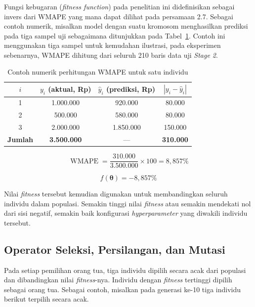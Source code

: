 Fungsi kebugaran (\textit{fitness function}) pada penelitian ini didefinisikan sebagai invers dari WMAPE yang mana dapat dilihat pada persamaan 2.7. Sebagai contoh numerik, misalkan model dengan suatu kromosom menghasilkan prediksi pada tiga sampel uji sebagaimana ditunjukkan pada Tabel~\ref{tab:contoh_wmape}.  Contoh ini menggunakan tiga sampel untuk kemudahan ilustrasi, pada eksperimen sebenarnya, WMAPE dihitung dari seluruh 210 baris data uji \textit{Stage 2}.

\begin{table}[h!]
\centering
\caption{Contoh numerik perhitungan WMAPE untuk satu individu}
\label{tab:contoh_wmape}
\begin{tabular}{cccc}
\toprule
$i$ & $y_i$ (aktual, Rp) & $\hat{y}_i$ (prediksi, Rp) & $|y_i - \hat{y}_i|$ \\
\midrule
1 & 1.000.000 & 920.000   & 80.000  \\
2 &   500.000 & 580.000   & 80.000  \\
3 & 2.000.000 & 1.850.000 & 150.000 \\
\midrule
\textbf{Jumlah} & \textbf{3.500.000} & --- & \textbf{310.000} \\
\bottomrule
\end{tabular}
\end{table}

\begin{equation}
\operatorname{WMAPE} = \frac{310.000}{3.500.000} \times 100 = 8{,}857\%
\end{equation}

\begin{equation}
f(\boldsymbol{\theta}) = -8{,}857\%
\end{equation}

Nilai \textit{fitness} tersebut kemudian digunakan untuk membandingkan seluruh individu dalam populasi. Semakin tinggi nilai \textit{fitness} atau semakin mendekati nol dari sisi negatif, semakin baik konfigurasi \textit{hyperparameter} yang diwakili individu tersebut.

\subsection{Operator Seleksi, Persilangan, dan Mutasi}
\label{subsec:operator_ga}

Pada setiap pemilihan orang tua, tiga individu dipilih secara acak dari populasi dan dibandingkan nilai \textit{fitness}-nya. Individu dengan \textit{fitness} tertinggi dipilih sebagai orang tua. Sebagai contoh, misalkan pada generasi ke-10 tiga individu berikut terpilih secara acak.


